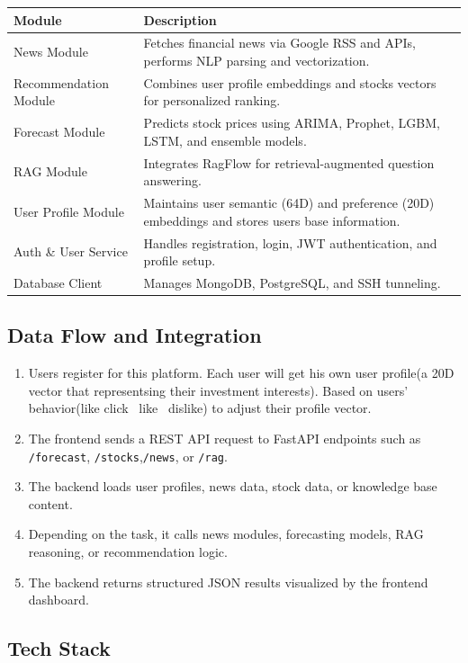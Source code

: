 \begin{longtable}{p{3cm}p{10cm}}
\toprule
\textbf{Module} & \textbf{Description} \\
\midrule
News Module & Fetches financial news via Google \acs{RSS} and APIs, performs \acs{NLP} parsing and vectorization. \\
Recommendation Module & Combines user profile embeddings and stocks vectors for personalized ranking. \\
Forecast Module & Predicts stock prices using \acs{ARIMA}, Prophet, \acs{LGBM}, \acs{LSTM}, and ensemble models. \\
RAG Module & Integrates RagFlow for retrieval-augmented question answering. \\
User Profile Module & Maintains user semantic (64D) and preference (20D) embeddings and stores users base information. \\
Auth \& User Service & Handles registration, login, JWT authentication, and profile setup. \\
Database Client & Manages MongoDB, PostgreSQL, and SSH tunneling. \\
\bottomrule
\end{longtable}

\subsection{Data Flow and Integration}
\begin{enumerate}[leftmargin=1.5em]
    \item Users register for this platform. Each user will get his own user profile(a 20D vector that representsing their investment interests). Based on users' behavior(like click \ like \ dislike) to adjust their profile vector.
    \item The frontend sends a REST API request to FastAPI endpoints such as \texttt{/forecast}, \texttt{/stocks},\texttt{/news}, or \texttt{/rag}.
    \item The backend loads user profiles, news data, stock data, or knowledge base content.
    \item Depending on the task, it calls news modules, forecasting models, RAG reasoning, or recommendation logic.
    \item The backend returns structured JSON results visualized by the frontend dashboard.
\end{enumerate}

\subsection{Tech Stack}

